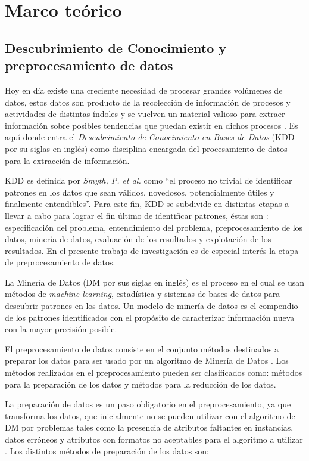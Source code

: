 \chapter{Marco teórico}
\label{capitulo1}

\section{Descubrimiento de Conocimiento y preprocesamiento de datos}

Hoy en día existe una creciente necesidad de procesar grandes volúmenes de datos, estos datos son producto de la recolección de información de procesos y actividades de distintas índoles y se vuelven un material valioso para extraer información sobre posibles tendencias que puedan existir en dichos procesos \cite{han2011data}. Es aquí donde entra el \emph{Descubrimiento de Conocimiento en Bases de Datos} (KDD por su siglas en inglés) como disciplina encargada del procesamiento de datos para la extracción de información.

KDD es definida por \emph{Smyth, P. et al.} \cite{fayyd1996data} como ``el proceso no trivial de identificar patrones en los datos que sean válidos, novedosos, potencialmente útiles y finalmente entendibles''. Para este fin, KDD se subdivide en distintas etapas a llevar a cabo para lograr el fin último de identificar patrones, éstas son \cite{garcia2016data}: especificación del problema, entendimiento del problema, preprocesamiento de los datos, minería de datos, evaluación de los resultados y explotación de los resultados. En el presente trabajo de investigación es de especial interés la etapa de preprocesamiento de datos.

La Minería de Datos (DM por sus siglas en inglés) \cite{hand2007principles} es el proceso en el cual se usan métodos de \emph{machine learning}, estadística y sistemas de bases de datos para descubrir patrones en los datos. Un modelo de minería de datos es el compendio de los patrones identificados con el propósito de caracterizar información nueva con la mayor precisión posible.

El preprocesamiento de datos \cite{garcia2016data} consiste en el conjunto métodos destinados a preparar los datos para ser usado por un algoritmo de Minería de Datos . Los métodos realizados en el preprocesamiento pueden ser clasificados como: métodos para la preparación de los datos y métodos para la reducción de los datos.

La preparación de datos es un paso obligatorio en el preprocesamiento, ya que transforma los datos, que inicialmente no se pueden utilizar con el algoritmo de DM por problemas tales como la presencia de atributos faltantes en instancias, datos erróneos y atributos con formatos no aceptables para el algoritmo a utilizar \cite{garcia2016data}. Los distintos métodos de preparación de los datos son:

